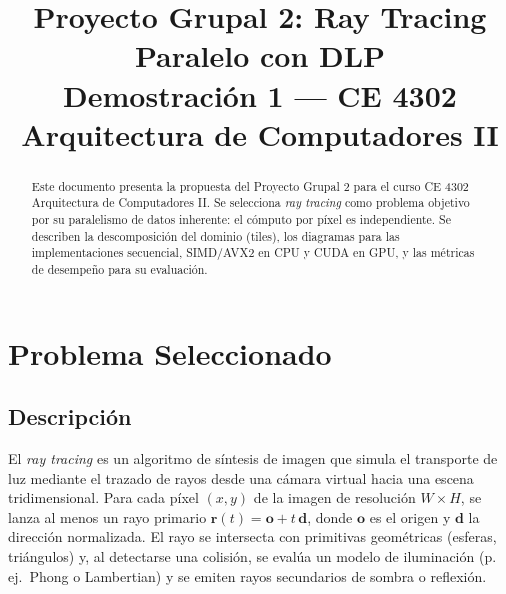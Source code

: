 \documentclass[conference]{IEEEtran}
\begin{document}
\title{\textbf{Proyecto Grupal 2: Ray Tracing Paralelo con DLP}\\
{\large Demostración 1 — CE 4302 Arquitectura de Computadores II}}

\author{
  \and
  \and
}

\maketitle

\begin{abstract}
Este documento presenta la propuesta del Proyecto Grupal 2 para el curso CE 4302
Arquitectura de Computadores II. Se selecciona \textit{ray tracing} como problema objetivo
por su paralelismo de datos inherente: el cómputo por píxel es independiente. Se describen
la descomposición del dominio (tiles), los diagramas para las implementaciones secuencial,
SIMD/AVX2 en CPU y CUDA en GPU, y las métricas de desempeño para su evaluación.
\end{abstract}

\section{Problema Seleccionado}

\subsection{Descripción}

El \textit{ray tracing} es un algoritmo de síntesis de imagen que simula el transporte de
luz mediante el trazado de rayos desde una cámara virtual hacia una escena tridimensional.
Para cada píxel $(x, y)$ de la imagen de resolución $W \times H$, se lanza al menos un rayo
primario $\mathbf{r}(t) = \mathbf{o} + t\,\mathbf{d}$, donde $\mathbf{o}$ es el origen y
$\mathbf{d}$ la dirección normalizada. El rayo se intersecta con primitivas geométricas
(esferas, triángulos) y, al detectarse una colisión, se evalúa un modelo de iluminación
(p. ej.\ Phong o Lambertian) y se emiten rayos secundarios de sombra o reflexión.
\end{document}

